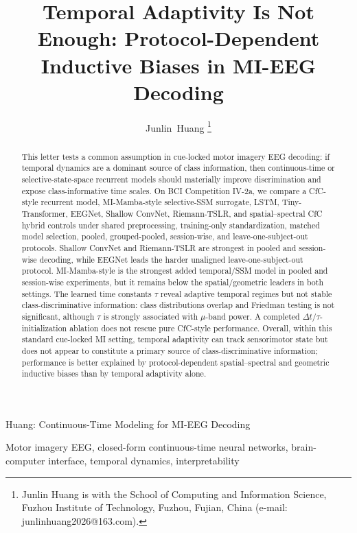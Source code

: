 \documentclass[journal]{IEEEtran}
\begin{document}
\title{Temporal Adaptivity Is Not Enough: Protocol-Dependent Inductive Biases in MI-EEG Decoding}

\author{Junlin~Huang%
\thanks{Junlin Huang is with the School of Computing and Information Science, Fuzhou Institute of Technology, Fuzhou, Fujian, China (e-mail: junlinhuang2026@163.com).}}

%
{Huang: Continuous-Time Modeling for MI-EEG Decoding}
\maketitle

\begin{abstract}
This letter tests a common assumption in cue-locked motor imagery EEG decoding: if temporal dynamics are a dominant source of class information, then continuous-time or selective-state-space recurrent models should materially improve discrimination and expose class-informative time scales. On BCI Competition IV-2a, we compare a CfC-style recurrent model, MI-Mamba-style selective-SSM surrogate, LSTM, Tiny-Transformer, EEGNet, Shallow ConvNet, Riemann-TSLR, and spatial--spectral CfC hybrid controls under shared preprocessing, training-only standardization, matched model selection, pooled, grouped-pooled, session-wise, and leave-one-subject-out protocols. Shallow ConvNet and Riemann-TSLR are strongest in pooled and session-wise decoding, while EEGNet leads the harder unaligned leave-one-subject-out protocol. MI-Mamba-style is the strongest added temporal/SSM model in pooled and session-wise experiments, but it remains below the spatial/geometric leaders in both settings. The learned time constants $\tau$ reveal adaptive temporal regimes but not stable class-discriminative information: class distributions overlap and Friedman testing is not significant, although $\tau$ is strongly associated with $\mu$-band power. A completed $\Delta t$/$\tau$-initialization ablation does not rescue pure CfC-style performance. Overall, within this standard cue-locked MI setting, temporal adaptivity can track sensorimotor state but does not appear to constitute a primary source of class-discriminative information; performance is better explained by protocol-dependent spatial--spectral and geometric inductive biases than by temporal adaptivity alone.
\end{abstract}

\begin{IEEEkeywords}
Motor imagery EEG, closed-form continuous-time neural networks, brain-computer interface, temporal dynamics, interpretability
\end{IEEEkeywords}
\end{document}
